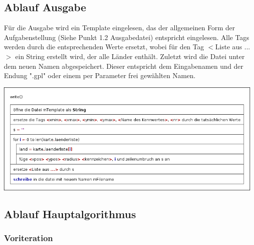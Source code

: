 \documentclass[a4paper,11pt]{article}
\begin{document}
{\subsection{Ablauf Ausgabe}
F\"ur die Ausgabe wird ein Template eingelesen, das der allgemeinen Form der Aufgabenstellung (Siehe Punkt 1.2 Ausgabedatei) entspricht eingelesen. Alle Tags werden 
durch die entsprechenden Werte ersetzt, wobei f\"ur den Tag $<$Liste aus ...$>$ ein String erstellt wird, der alle L\"ander enth\"alt. Zuletzt wird die Datei unter dem neuen Namen
abgespeichert. Dieser entspricht dem Eingabenamen und der Endung ".gpl" oder einem per Parameter frei gew\"ahlten Namen.

\begin{center}
	\vbox{
		\includegraphics[width=\linewidth]{write.png}
	}	
\end{center}


\subsection{Ablauf Hauptalgorithmus}

\subsubsection{Voriteration}

}
\end{document}
